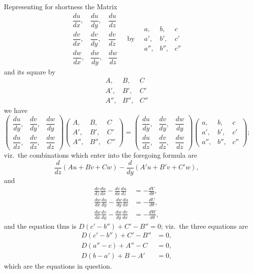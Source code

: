 \documentclass[11pt,a4paper]{article}
\begin{document}
Representing for shortness the Matrix
\[
\begin{matrix}
\dfrac{du}{dx}, & \dfrac{du}{dy}, & \dfrac{du}{dz} \\[1em]
\dfrac{dv}{dx}, & \dfrac{dv}{dy}, & \dfrac{dv}{dz} \\[1em]
\dfrac{dw}{dx}, & \dfrac{dw}{dy}, & \dfrac{dw}{dz}
\end{matrix}
\quad\text{by}\quad
\begin{matrix}
a, & b, & c \\
a', & b', & c' \\
a'', & b'', & c''
\end{matrix}
\]
and its square by
\[
\begin{matrix}
A, & B, & C \\
A', & B', & C' \\
A'', & B'', & C''
\end{matrix}
\]
we have
\[
\begin{pmatrix}
\dfrac{du}{dy}, & \dfrac{dv}{dy}, & \dfrac{dw}{dy} \\
\dfrac{du}{dz}, & \dfrac{dv}{dz}, & \dfrac{dw}{dz}
\end{pmatrix}
\begin{pmatrix}
A, & B, & C \\
A', & B', & C' \\
A'', & B'', & C''
\end{pmatrix}
=
\begin{pmatrix}
\dfrac{du}{dy}, & \dfrac{dv}{dy}, & \dfrac{dw}{dy} \\
\dfrac{du}{dz}, & \dfrac{dv}{dz}, & \dfrac{dw}{dz}
\end{pmatrix}
\begin{pmatrix}
a, & b, & c \\
a', & b', & c' \\
a'', & b'', & c''
\end{pmatrix};
\]
viz.\ the combinations which enter into the foregoing formula are
\[
\frac{d}{dz}(Au + Bv + Cw) - \frac{d}{dy}(A'u + B'v + C'w),
\]
and
\begin{align*}
\frac{dv}{dz}\frac{du}{dx} - \frac{dv}{dx}\frac{du}{dz} &= -\frac{dV}{d\theta}, \\
\frac{dw}{dx}\frac{du}{dy} - \frac{dw}{dy}\frac{du}{dx} &= -\frac{dU}{d\theta}, \\
\frac{dw}{dx}\frac{dv}{dy} - \frac{dw}{dy}\frac{dv}{dx} &= -\frac{dW}{d\theta},
\end{align*}
and the equation thus is $D(c' - b'') + C' - B'' = 0$; viz.\ the three equations are
\begin{align*}
D(c' - b'') + C' - B'' &= 0, \\
D(a'' - c) + A'' - C &= 0, \\
D(b - a') + B - A' &= 0,
\end{align*}
which are the equations in question.
\end{document}
